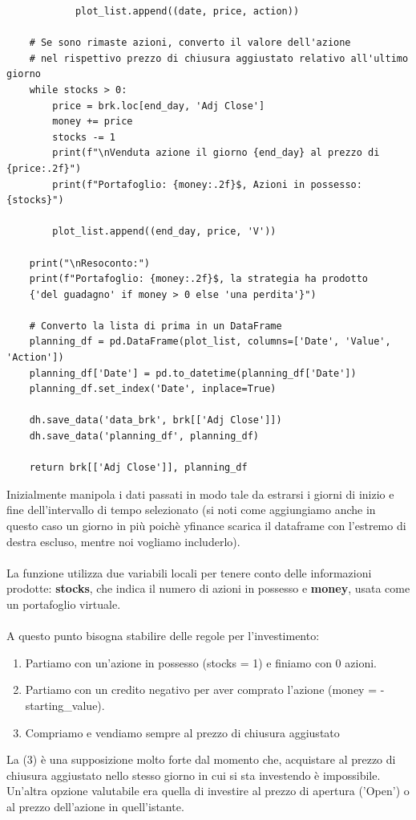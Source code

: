 \documentclass{article}
\begin{document}
\begin{verbatim}
            plot_list.append((date, price, action))

    # Se sono rimaste azioni, converto il valore dell'azione
    # nel rispettivo prezzo di chiusura aggiustato relativo all'ultimo giorno
    while stocks > 0:
        price = brk.loc[end_day, 'Adj Close']
        money += price
        stocks -= 1
        print(f"\nVenduta azione il giorno {end_day} al prezzo di {price:.2f}")
        print(f"Portafoglio: {money:.2f}$, Azioni in possesso: {stocks}")

        plot_list.append((end_day, price, 'V'))

    print("\nResoconto:")
    print(f"Portafoglio: {money:.2f}$, la strategia ha prodotto 
    {'del guadagno' if money > 0 else 'una perdita'}")

    # Converto la lista di prima in un DataFrame
    planning_df = pd.DataFrame(plot_list, columns=['Date', 'Value', 'Action'])
    planning_df['Date'] = pd.to_datetime(planning_df['Date'])
    planning_df.set_index('Date', inplace=True)

    dh.save_data('data_brk', brk[['Adj Close']])
    dh.save_data('planning_df', planning_df)

    return brk[['Adj Close']], planning_df
\end{verbatim}
Inizialmente manipola i dati passati in modo tale da estrarsi i giorni di inizio e fine dell'intervallo di tempo selezionato (si noti come aggiungiamo anche in questo caso un giorno in più poichè yfinance scarica il dataframe con l'estremo di destra escluso, mentre noi vogliamo includerlo).\\ \\
La funzione utilizza due variabili locali per tenere conto delle informazioni prodotte: \textbf{stocks}, che indica il numero di azioni in possesso e  \textbf{money}, usata come un portafoglio virtuale. \\ \\
A questo punto bisogna stabilire delle regole per l'investimento:
\begin{enumerate}
    \item Partiamo con un'azione in possesso (stocks = 1) e finiamo con 0 azioni.
    \item Partiamo con un credito negativo per aver comprato l'azione (money = -starting\_value).
    \item Compriamo e vendiamo sempre al prezzo di chiusura aggiustato \label{item:terzo}
\end{enumerate}
La (3) è una supposizione molto forte dal momento che, acquistare al prezzo di chiusura aggiustato nello stesso giorno in cui si sta investendo è impossibile. Un'altra opzione valutabile era quella di investire al prezzo di apertura ('Open') o al prezzo dell'azione in quell'istante. \\ \\
\end{document}
